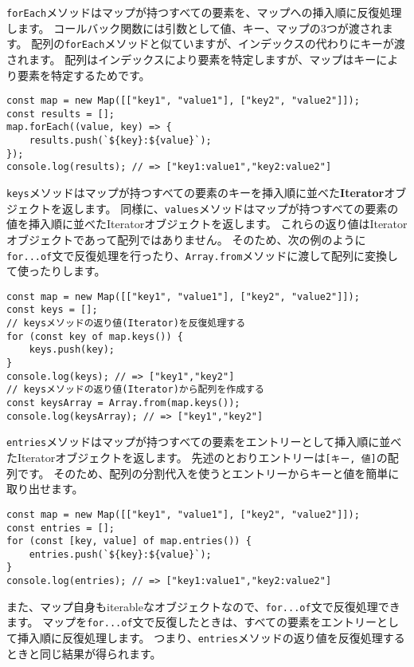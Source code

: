 \texttt{forEach}メソッドはマップが持つすべての要素を、マップへの挿入順に反復処理します。
コールバック関数には引数として値、キー、マップの3つが渡されます。
配列の\texttt{forEach}メソッドと似ていますが、インデックスの代わりにキーが渡されます。
配列はインデックスにより要素を特定しますが、マップはキーにより要素を特定するためです。

\begin{lstlisting}
const map = new Map([["key1", "value1"], ["key2", "value2"]]);
const results = [];
map.forEach((value, key) => {
    results.push(`${key}:${value}`);
});
console.log(results); // => ["key1:value1","key2:value2"]
\end{lstlisting}

\texttt{keys}メソッドはマップが持つすべての要素のキーを挿入順に並べた\textbf{Iterator}オブジェクトを返します。
同様に、\texttt{values}メソッドはマップが持つすべての要素の値を挿入順に並べたIteratorオブジェクトを返します。
これらの返り値はIteratorオブジェクトであって配列ではありません。
そのため、次の例のように\texttt{for...of}文で反復処理を行ったり、\texttt{Array.from}メソッドに渡して配列に変換して使ったりします。

\begin{lstlisting}
const map = new Map([["key1", "value1"], ["key2", "value2"]]);
const keys = [];
// keysメソッドの返り値(Iterator)を反復処理する
for (const key of map.keys()) {
    keys.push(key);
}
console.log(keys); // => ["key1","key2"]
// keysメソッドの返り値(Iterator)から配列を作成する
const keysArray = Array.from(map.keys());
console.log(keysArray); // => ["key1","key2"]
\end{lstlisting}

\texttt{entries}メソッドはマップが持つすべての要素をエントリーとして挿入順に並べたIteratorオブジェクトを返します。
先述のとおりエントリーは\texttt{[キー, 値]}の配列です。
そのため、配列の分割代入を使うとエントリーからキーと値を簡単に取り出せます。

\begin{lstlisting}
const map = new Map([["key1", "value1"], ["key2", "value2"]]);
const entries = [];
for (const [key, value] of map.entries()) {
    entries.push(`${key}:${value}`);
}
console.log(entries); // => ["key1:value1","key2:value2"]
\end{lstlisting}

また、マップ自身もiterableなオブジェクトなので、\texttt{for...of}文で反復処理できます。
マップを\texttt{for...of}文で反復したときは、すべての要素をエントリーとして挿入順に反復処理します。
つまり、\texttt{entries}メソッドの返り値を反復処理するときと同じ結果が得られます。

